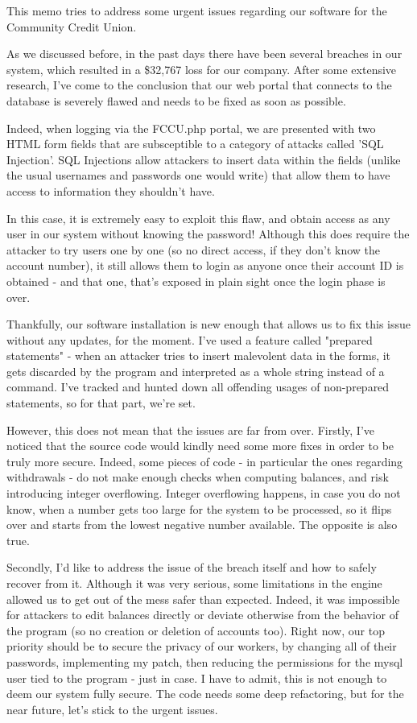\documentclass[paper=a4]{../../_global/texMemo}
\begin{document}
\maketitle

This memo tries to address some urgent issues regarding our software for the Community Credit Union. 

As we discussed before, in the past days there have been several breaches in our system, which resulted in a \$32,767 loss for our company. After some extensive research, I've come to the conclusion that our web portal that connects to the database is severely flawed and needs to be fixed as soon as possible.

Indeed, when logging via the FCCU.php portal, we are presented with two HTML form fields that are subsceptible to a category of attacks called 'SQL Injection'. SQL Injections allow attackers to insert data within the fields (unlike the usual usernames and passwords one would write) that allow them to have access to information they shouldn't have.

In this case, it is extremely easy to exploit this flaw, and obtain access as any user in our system without knowing the password! Although this does require the attacker to try users one by one (so no direct access, if they don't know the account number), it still allows them to login as anyone once their account ID is obtained - and that one, that's exposed in plain sight once the login phase is over.

Thankfully, our software installation is new enough that allows us to fix this issue without any updates, for the moment. I've used a feature called "prepared statements" - when an attacker tries to insert malevolent data in the forms, it gets discarded by the program and interpreted as a whole string instead of a command. I've tracked and hunted down all offending usages of non-prepared statements, so for that part, we're set.

However, this does not mean that the issues are far from over. Firstly, I've noticed that the source code would kindly need some more fixes in order to be truly more secure. Indeed, some pieces of code - in particular the ones regarding withdrawals - do not make enough checks when computing balances, and risk introducing integer overflowing. Integer overflowing happens, in case you do not know, when a number gets too large for the system to be processed, so it flips over and starts from the lowest negative number available. The opposite is also true.

Secondly, I'd like to address the issue of the breach itself and how to safely recover from it. Although it was very serious, some limitations in the engine allowed us to get out of the mess safer than expected. Indeed, it was impossible for attackers to edit balances directly or deviate otherwise from the behavior of the program (so no creation or deletion of accounts too). Right now, our top priority should be to secure the privacy of our workers, by changing all of their passwords, implementing my patch, then reducing the permissions for the mysql user tied to the program - just in case. I have to admit, this is not enough to deem our system fully secure. The code needs some deep refactoring, but for the near future, let's stick to the urgent issues.
\end{document}

